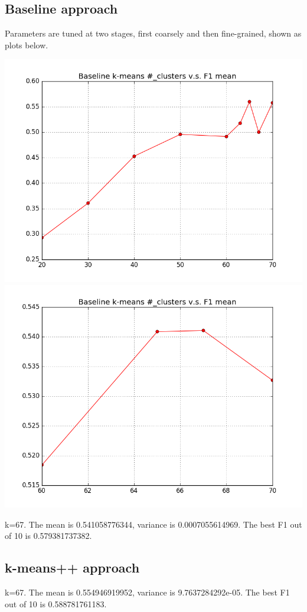\documentclass{article}
\begin{document}
\subsection{Baseline approach}
Parameters are tuned at two stages, first coarsely and then fine-grained, shown as plots below. \\
\begin{center}
\includegraphics[scale=0.3]{Coarsefrom20to80.png}
\includegraphics[scale=0.3]{finefrom60to70.png}
\end{center}

k=67. The mean is 0.541058776344, variance is 0.0007055614969. The best F1 out of 10 is 0.579381737382.\\
\subsection{k-means++ approach}
k=67. The mean is 0.554946919952, variance is 9.7637284292e-05. The best F1 out of 10 is 0.588781761183. \\
\end{document}
